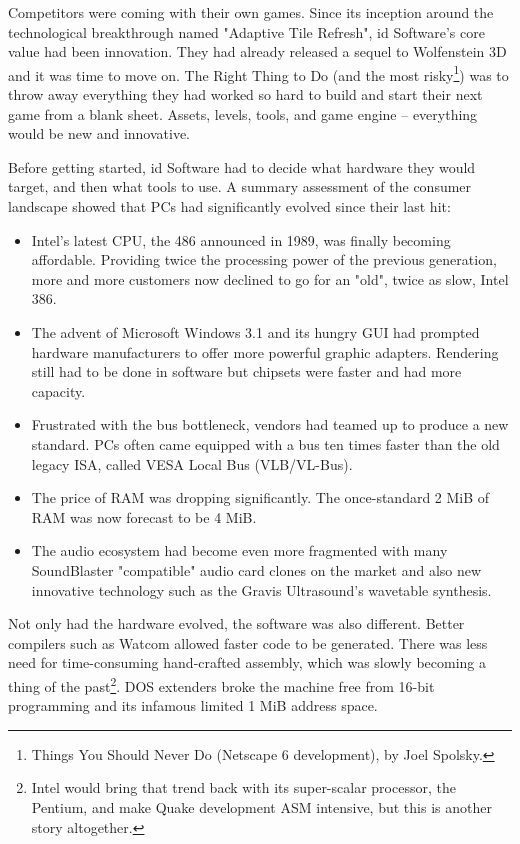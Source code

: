 Competitors were coming with their own games. Since its inception around the technological breakthrough named "Adaptive Tile Refresh", id Software's core value had been innovation. They had already released a sequel to Wolfenstein 3D and it was time to move on. The Right Thing to Do (and the most risky\footnote{Things You Should Never Do (Netscape 6 development), by Joel Spolsky.}) was to throw away everything they had worked so hard to build and start their next game from a blank sheet. Assets, levels, tools, and game engine -- everything would be new and innovative.\\
\par
Before getting started, id Software had to decide what hardware they would target, and then what tools to use. A summary assessment of the consumer landscape showed that PCs had significantly evolved since their last hit:
\begin{itemize}
\item Intel's latest CPU, the 486 announced in 1989, was finally becoming affordable. Providing twice the processing power of the previous generation, more and more customers now declined to go for an "old", twice as slow, Intel 386. 
\item The advent of Microsoft Windows 3.1 and its hungry GUI had prompted hardware manufacturers to offer more powerful graphic adapters. Rendering still had to be done in software but chipsets were faster and had more capacity.
\item Frustrated with the bus bottleneck, vendors had teamed up to produce a new standard. PCs often came equipped with a bus ten times faster than the old legacy ISA, called VESA Local Bus (VLB/VL-Bus). 
\item The price of RAM was dropping significantly. The once-standard 2 MiB of RAM was now forecast to be 4 MiB. 
\item The audio ecosystem had become even more fragmented with many SoundBlaster "compatible" audio card clones on the market and also new innovative technology such as the Gravis Ultrasound's wavetable synthesis.\\
\end{itemize}
 \par 
 Not only had the hardware evolved, the software was also different. Better compilers such as Watcom allowed faster code to be generated. There was less need for time-consuming hand-crafted assembly, which was slowly becoming a thing of the past\footnote{Intel would bring that trend back with its super-scalar processor, the Pentium, and make Quake development ASM intensive, but this is another story altogether.}. DOS extenders broke the machine free from 16-bit programming and its infamous limited 1 MiB address space.\\
